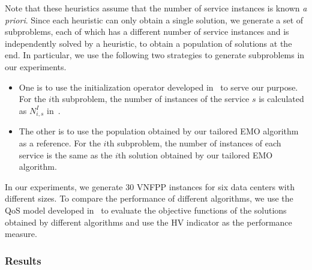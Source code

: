 Note that these heuristics assume that the number of service instances is known \textit{a priori}. Since each heuristic can only obtain a single solution, we generate a set of subproblems, each of which has a different number of service instances and is independently solved by a heuristic, to obtain a population of solutions at the end. In particular, we use the following two strategies to generate subproblems in our experiments.
\begin{itemize}
    \item One is to use the initialization operator developed in~ to serve our purpose. For the $i$th subproblem, the number of instances of the service $s$ is calculated as $N^I_{i,s}$ in~.

    \item The other is to use the population obtained by our tailored EMO algorithm as a reference. For the $i$th subproblem, the number of instances of each service is the same as the $i$th solution obtained by our tailored EMO algorithm.
\end{itemize}
In our experiments, we generate $30$ VNFPP instances for six data centers with different sizes. To compare the performance of different algorithms, we use the QoS model developed in~ to evaluate the objective functions of the solutions obtained by different algorithms and use the HV indicator as the performance measure.

\subsubsection{Results}

